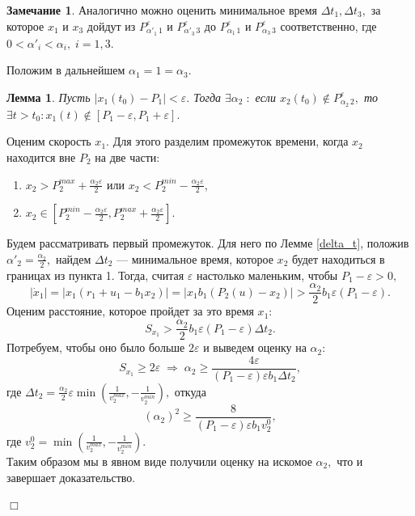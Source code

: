 \documentclass[11pt]{article}
\newtheorem{lemma}{Лемма}
\theoremstyle{definition}
\newtheorem{Remark_l}{Замечание}[lemma]
\newenvironment{Proof}
{\par\noindent{\bf Доказательство.\\}} 
{\begin{flushright}$\Box$\end{flushright}}
\begin{document}
\begin{Remark_l}
\label{rem_1}
	 Аналогично можно оценить минимальное время $\Delta t_1, \Delta t_3,$ за которое $x_1$ и $x_3$ дойдут из $P_{\alpha'_1 \, 1}^{\varepsilon} \text{ и } P_{\alpha'_3 \, 3}^{\varepsilon}$ до $P_{\alpha_1 \, 1}^{\varepsilon} \text{ и } P_{\alpha_3 \, 3}^{\varepsilon}$ соответственно, где $0 <\alpha'_i < \alpha_i, \; i = 1,3.$
\end{Remark_l}

Положим в дальнейшем $\alpha_1 = 1 = \alpha_3.$


\begin{lemma}
\label{alpha_2}
	Пусть $|x_1(t_0) - P_1| < \varepsilon.$
	Тогда $\exists \alpha_2 \;:$ если $x_2(t_0) \not \in P_{\alpha_2 \, 2}^{\varepsilon},$ то
$\exists t > t_0 : x_1(t) \not \in [P_1 - \varepsilon, P_1 + \varepsilon].$
\end{lemma}
\begin{Proof}
	Оценим скорость $x_1.$ Для этого разделим промежуток времени, когда $x_2$ находится вне $P_2$ на две части: 
	\begin{enumerate}
		\item $x_2 > P_2^{max} + \frac{\alpha_2\varepsilon}{2}$ или $x_2 < P_2^{min} - \frac{\alpha_2\varepsilon}{2}$,
		\item $x_2 \in [P_2^{min} - \frac{\alpha_2\varepsilon}{2}, P_2^{max} + \frac{\alpha_2\varepsilon}{2}].$
	\end{enumerate}
	Будем рассматривать первый промежуток. Для него по Лемме \ref{delta_t}, положив $\alpha'_2 = \frac{\alpha_2}{2},$ найдем $\Delta t_2$ --- минимальное время, которое $x_2$ будет находиться в границах из пункта 1. Тогда, считая $\varepsilon$ настолько маленьким, чтобы $P_1 - \varepsilon > 0,$
	$$|\dot x_1| = |x_1(r_1 +u_1 - b_1x_2)| = |x_1b_1(P_2(u) - x_2)| > \frac{\alpha_2}{2}b_1\varepsilon(P_1 - \varepsilon).$$ 
	Оценим расстояние, которое пройдет за это время $x_1:$
	$$S_{x_1} > \frac{\alpha_2}{2}b_1\varepsilon(P_1 - \varepsilon) \Delta t_2.$$
	Потребуем, чтобы оно было больше $2\varepsilon$ и выведем оценку на $\alpha_2:$
	$$S_{x_1} \geqslant 2 \varepsilon \; \Rightarrow \; \alpha_2 \geqslant \frac{4\varepsilon}{(P_1 - \varepsilon)\varepsilon b_1\Delta t_2},$$
	где $\Delta t_2 = \frac{\alpha_2}{2}\varepsilon\min(\frac{1}{v_2^{max}}, -\frac{1}{v_2^{min}}),$ откуда 
	$$(\alpha_2)^2 \geqslant \frac{8}{(P_1 - \varepsilon)\varepsilon b_1v_2^0},$$
	где $v_2^0 = \min(\frac{1}{v_2^{max}}, -\frac{1}{v_2^{min}}).$\\
	Таким образом мы в явном виде получили оценку на искомое $\alpha_2,$ что и завершает доказательство.
\end{Proof}
\end{document}

